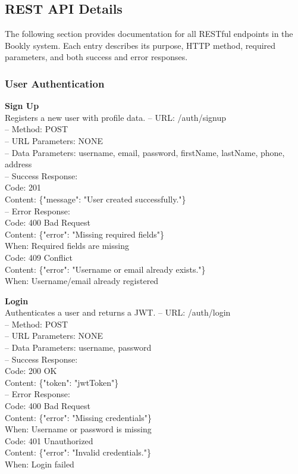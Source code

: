 \subsection*{REST API Details}

The following section provides documentation for all RESTful endpoints in the Bookly system. Each entry describes its purpose, HTTP method, required parameters, and both success and error responses.

\subsubsection*{User Authentication}

\textbf{Sign Up} \\
Registers a new user with profile data.
– URL: /auth/signup \\
– Method: POST \\
– URL Parameters: NONE \\
– Data Parameters: username, email, password, firstName, lastName, phone, address \\
– Success Response: \\
Code: 201 \\
Content: \{"message": "User created successfully."\} \\
– Error Response: \\
Code: 400 Bad Request \\
Content: \{"error": "Missing required fields"\} \\
When: Required fields are missing \\
Code: 409 Conflict \\
Content: \{"error": "Username or email already exists."\} \\
When: Username/email already registered

\textbf{Login} \\
Authenticates a user and returns a JWT.
– URL: /auth/login \\
– Method: POST \\
– URL Parameters: NONE \\
– Data Parameters: username, password \\
– Success Response: \\
Code: 200 OK \\
Content: \{"token": "jwtToken"\} \\
– Error Response: \\
Code: 400 Bad Request \\
Content: \{"error": "Missing credentials"\} \\
When: Username or password is missing \\
Code: 401 Unauthorized \\
Content: \{"error": "Invalid credentials."\} \\
When: Login failed

